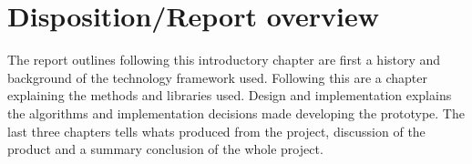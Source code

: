 \section{Disposition/Report overview}

The report outlines following this introductory chapter are first a history and background of the technology framework used. Following this are a chapter explaining the methods and libraries used. Design and implementation explains the algorithms and implementation decisions made developing the prototype. The last three chapters tells whats produced from the project, discussion of the product and a summary conclusion of the whole project.

